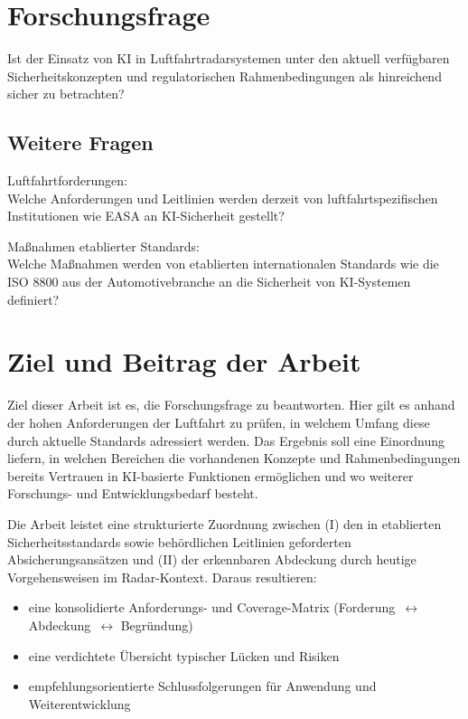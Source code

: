 \section{Forschungsfrage}
Ist der Einsatz von KI in Luftfahrtradarsystemen 
unter den aktuell verfügbaren Sicherheitskonzepten und regulatorischen Rahmenbedingungen 
als hinreichend sicher zu betrachten?

\subsection*{Weitere Fragen}
Luftfahrtforderungen:\\
Welche Anforderungen und Leitlinien werden derzeit von 
luftfahrtspezifischen Institutionen wie EASA an KI-Sicherheit gestellt?

\medskip
Maßnahmen etablierter Standards:\\
Welche Maßnahmen werden von etablierten internationalen Standards wie die ISO 8800 aus der Automotivebranche 
an die Sicherheit von KI-Systemen definiert?

\section{Ziel und Beitrag der Arbeit}
Ziel dieser Arbeit ist es, die Forschungsfrage zu beantworten.
Hier gilt es anhand der hohen Anforderungen der Luftfahrt zu prüfen, in welchem Umfang 
diese durch aktuelle Standards adressiert werden.
Das Ergebnis soll eine Einordnung liefern, in welchen Bereichen die vorhandenen Konzepte und 
Rahmenbedingungen bereits Vertrauen in KI-basierte Funktionen ermöglichen und wo weiterer 
Forschungs- und Entwicklungsbedarf besteht.

\medskip
Die Arbeit leistet eine strukturierte Zuordnung zwischen (I) den in 
etablierten Sicherheitsstandards sowie behördlichen Leitlinien geforderten 
Absicherungsansätzen und (II) der erkennbaren Abdeckung durch heutige 
Vorgehensweisen im Radar-Kontext. Daraus resultieren:

\medskip
\begin{itemize}
\item eine konsolidierte Anforderungs- und Coverage-Matrix (Forderung~$\leftrightarrow$ Abdeckung~$\leftrightarrow$ Begründung)
\item eine verdichtete Übersicht typischer Lücken und Risiken
\item empfehlungsorientierte Schlussfolgerungen für Anwendung und Weiterentwicklung
\end{itemize}



